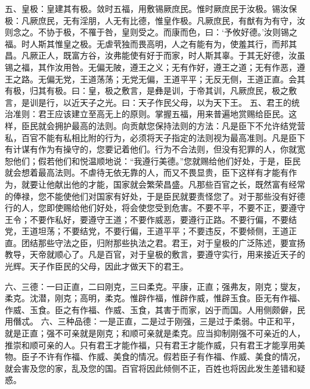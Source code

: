 \documentclass[a4paper,12pt,UTF8,twoside]{ctexbook}
\begin{document}
五、皇极：皇建其有极。敛时五福，用敷锡厥庶民。惟时厥庶民于汝极。锡汝保极：凡厥庶民，无有淫朋，人无有比德，惟皇作极。凡厥庶民，有猷有为有守，汝则念之。不协于极，不罹于咎，皇则受之。而康而色，曰：‘予攸好德。’汝则锡之福。时人斯其惟皇之极。无虐茕独而畏高明，人之有能有为，使羞其行，而邦其昌。凡厥正人，既富方谷，汝弗能使有好于而家，时人斯其辜。于其无好德，汝虽锡之福，其作汝用咎。无偏无陂，遵王之义；无有作好，遵王之道；无有作恶，遵王之路。无偏无党，王道荡荡；无党无偏，王道平平；无反无侧，王道正直。会其有极，归其有极。曰：皇，极之敷言，是彝是训，于帝其训，凡厥庶民，极之敷言，是训是行，以近天子之光。曰：天子作民父母，以为天下王。
五、君王的统治准则：君王应该建立至高无上的原则。掌握五福，用来普遍地赏赐给臣民。这样，臣民就会拥护最高的法则。向贡献您保持法则的方法：凡是臣下不允许结党营私，百官不能有私相比附的行为，必须将天子指定的法则视为最高准则。凡是臣下有计谋有作为有操守的，您要记着他们。行为不合法则，但没有犯罪的人，你就宽恕他们；假若他们和悦温顺地说：“我遵行美德。”您就赐给他们好处，于是，臣民就会想着最高法则。不虐待无依无靠的人，而又不畏显贵，臣下这样有才能有作为，就要让他献出他的才能，国家就会繁荣昌盛。凡那些百官之长，既然富有经常的俸禄，您不能使他们对国家有好处，于是臣民就要责怪您了。对于那些没有好德行的人，您即使赐给他们好处，将会使您受到危害。不要不平，不要不正，要遵守王令；不要作私好，要遵守王道；不要作威恶，要遵行正路。不要行偏，不要结党，王道坦荡；不要结党，不要行偏，王道平平；不要违反，不要倾侧，王道正直。团结那些守法之臣，归附那些执法之君。君王，对于皇极的广泛陈述，要宣扬教导，天帝就顺心了。凡是百官，对于皇极的敷言，要遵守实行，用来接近天子的光辉。天子作臣民的父母，因此才做天下的君王。

六、三德：一曰正直，二曰刚克，三曰柔克。平康，正直；强弗友，刚克；燮友，柔克。沈潜，刚克；高明，柔克。惟辟作福，惟辟作威，惟辟玉食。臣无有作福、作威、玉食。臣之有作福、作威、玉食，其害于而家，凶于而国。人用侧颇僻，民用僭忒。
六、三种品德：一是正直，二是过于刚强，三是过于柔弱。中正和平，就是正直；强不可亲就是刚克；和顺可亲就是柔克。应当抑制刚强不可亲近的人，推崇和顺可亲的人。只有君王才能作福，只有君王才能作威，只有君王才能享用美物。臣子不许有作福、作威、美食的情况。假若臣子有作福、作威、美食的情况，就会害及您的家，乱及您的国。百官将因此倾侧不正，百姓也将因此发生差错和疑惑。
\end{document}
